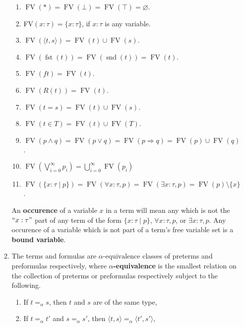 \documentclass{tac}
\begin{document}
\begin{definition}
\begin{enumerate}
\begin{enumerate}
				\begin{enumerate}
					\item $\operatorname{FV}(\ast) = \operatorname{FV}(\bot) = \operatorname{FV}(\top) = \varnothing$.
					\item FV$(x:\tau) = \lbrace x:\tau \rbrace$, if $x:\tau$ is any variable.
					\item $\operatorname{FV}(\langle t,s\rangle) = \operatorname{FV}(t) \cup \operatorname{FV}(s)$.
					\item $\operatorname{FV}(\operatorname{fst}(t)) = \operatorname{FV}(\operatorname{snd}(t)) = \operatorname{FV}(t)$.
					\item $\operatorname{FV}(ft) = \operatorname{FV}(t)$.
					\item $\operatorname{FV}(R(t)) = \operatorname{FV}(t)$.
					\item $\operatorname{FV}(t = s) = \operatorname{FV}(t) \cup \operatorname{FV}(s)$.
					\item $\operatorname{FV}(t \in T) = \operatorname{FV}(t) \cup \operatorname{FV}(T)$.
					\item $\operatorname{FV}(p \wedge q) = \operatorname{FV}(p \vee q) = \operatorname{FV}(p \Rightarrow q) = \operatorname{FV}(p) \cup \operatorname{FV}(q)$.
					\item $\operatorname{FV}(\bigvee_{i = 0}^\infty p_i) = \bigcup_{i = 0}^\infty\operatorname{FV}(p_i)$
					\item $\operatorname{FV}(\lbrace x : \tau \mid p\rbrace) = \operatorname{FV}(\forall x : \tau,p) = \operatorname{FV}(\exists x : \tau,p) = \operatorname{FV}(p) \setminus \lbrace x \rbrace$.
				\end{enumerate}
				An \textbf{occurence} of a variable $x$ in a term will mean any which is not the $``x : \tau"$ part of any term of the form $\lbrace x : \tau\mid p\rbrace$, $\forall x : \tau, p$, or $\exists x : \tau, p$. Any occurence of a variable which is not part of a term's free variable set is a \textbf{bound variable}.
				\item The terms and formulas are $\alpha$-$\text{equivalence}$ classes of preterms and preformulas respectively, where \textbf{$\alpha$-equivalence} is the smallest relation on the collection of preterms or preformulas respectively subject to the following.
				\begin{enumerate}
					\item If $t =_\alpha s$, then $t$ and $s$ are of the same type,
					\item If $t =_\alpha t'$ and $s =_\alpha s'$, then $\langle t,s\rangle =_\alpha \langle t', s'\rangle$,

\end{enumerate}
\end{enumerate}
\end{enumerate}
\end{definition}
\end{document}
